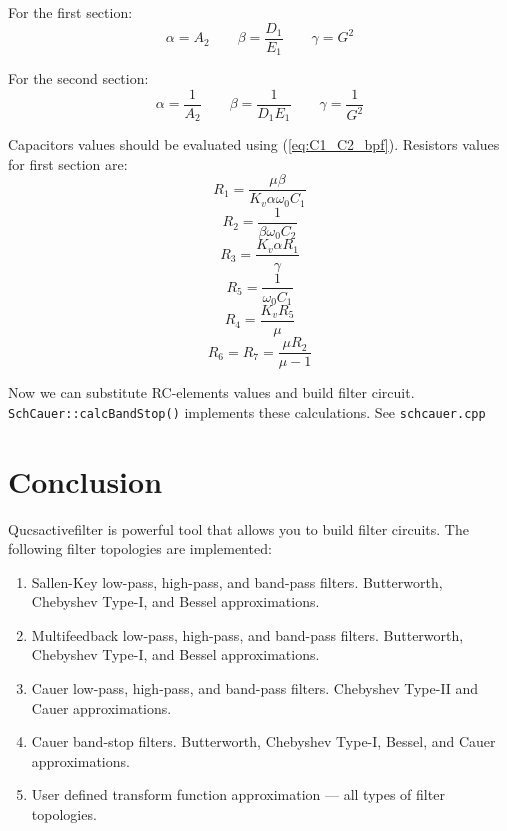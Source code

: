For the first section:
\begin{equation}
 \alpha = A_2 \qquad \beta=\frac{D_1}{E_1} \qquad \gamma=G^2
\end{equation}


For the second section:
\begin{equation}
 \alpha = \frac{1}{A_2} \qquad \beta=\frac{1}{D_1E_1} \qquad 
\gamma=\frac{1}{G^2}
\end{equation}

Capacitors values should be evaluated using (\ref{eq:C1_C2_bpf}). Resistors 
values for first section are:
\begin{equation}
R_1=\frac{\mu\beta}{K_v\alpha\omega_0C_1} 
\end{equation}
\begin{equation}
 R_2=\frac{1}{\beta\omega_0 C_2}
\end{equation}
\begin{equation}
 R_3=\frac{K_v\alpha R_1}{\gamma}
\end{equation}
\begin{equation}
 R_5 = \frac{1}{\omega_0 C_1}
\end{equation}
\begin{equation}
 R_4=\frac{K_vR_5}{\mu}
\end{equation}
\begin{equation}
 R_6=R_7=\frac{\mu R_2}{\mu-1}
\end{equation}


Now we can substitute RC-elements values and build filter circuit. 
\verb|SchCauer::calcBandStop()| implements these calculations. See 
\verb|schcauer.cpp|


\chapter{Conclusion}

Qucsactivefilter is powerful tool that allows you to build filter circuits. The 
following filter topologies are implemented:
\begin{enumerate}
 \item Sallen-Key low-pass, high-pass, and band-pass filters. Butterworth, 
Chebyshev Type-I, and Bessel approximations.
 \item Multifeedback low-pass, high-pass, and band-pass filters. Butterworth, 
Chebyshev Type-I, and Bessel approximations.
 \item Cauer low-pass, high-pass, and band-pass filters. Chebyshev Type-II and 
Cauer approximations.
 \item Cauer band-stop filters. Butterworth, Chebyshev Type-I, Bessel, and 
Cauer approximations.
 \item User defined transform function approximation --- all types of filter 
topologies.
\end{enumerate}

